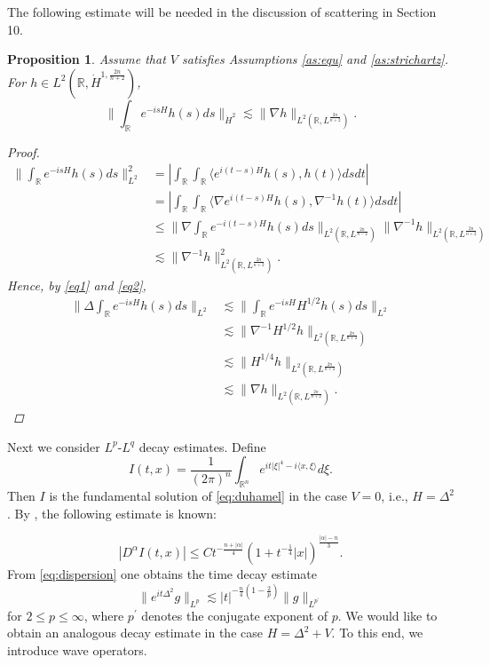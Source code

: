 \documentclass[11pt,a4paper]{article}
\numberwithin{equation}{section}
\newtheorem{proposition}[theorem]{Proposition}
\begin{document}
The following estimate will be needed in the discussion of scattering in Section 10.
\begin{proposition}
Assume that $V$ satisfies Assumptions \ref{as:equ} and \ref{as:strichartz}. For $h\in L^{2}(\mathbb{R}, \dot{H}^{1, \frac{2n}{n + 2}})$,
\begin{equation}\label{strichartz for scattering}
\|\int_{\mathbb{R}} e^{-isH}h(s)ds\|_{\dot{H}^{2}} \lesssim \|\nabla h\|_{L^{2}(\mathbb{R}, L^{\frac{2n}{n + 2}})}.
\end{equation}
\begin{proof}
\begin{align*}
\|\int_{\mathbb{R}} e^{-isH}h(s)ds\|_{L^{2}}^{2} &= \left| \int_{\mathbb{R}} \int_{\mathbb{R}} \langle e^{i(t - s)H}h(s), h(t) \rangle ds dt\right| \\
&= \left| \int_{\mathbb{R}} \int_{\mathbb{R}} \langle \nabla e^{i(t - s)H}h(s), \nabla^{-1} h(t) \rangle ds dt\right| \\
&\leq \|\nabla \int_{\mathbb{R}} e^{-i(t-s)H}h(s)ds\|_{L^{2}(\mathbb{R}, L^{\frac{2n}{n - 2}})}\|\nabla^{-1}h\|_{L^{2}(\mathbb{R}, L^{\frac{2n}{n + 2}})} \\
&\lesssim \|\nabla^{-1}h\|_{L^{2}(\mathbb{R}, L^{\frac{2n}{n + 2}})}^{2}.
\end{align*}
Hence, by \eqref{eq1} and \eqref{eq2},
\begin{align*}
\|\Delta \int_{\mathbb{R}} e^{-isH}h(s)ds\|_{L^{2}} &\lesssim \|\int_{\mathbb{R}} e^{-isH}H^{1/2}h(s)ds\|_{L^{2}} \\
&\lesssim \|\nabla^{-1}H^{1/2}h\|_{L^{2}(\mathbb{R}, L^{\frac{2n}{n + 2}})} \\
&\lesssim \|H^{1/4}h\|_{L^{2}(\mathbb{R}, L^{\frac{2n}{n + 2}})} \\
&\lesssim \|\nabla h\|_{L^{2}(\mathbb{R}, L^{\frac{2n}{n + 2}})}.
\end{align*}
\end{proof}
\end{proposition}

Next we consider $L^{p}$-$L^{q}$ decay estimates. Define
\[ I(t, x) = \dfrac{1}{(2\pi)^{n}}\int_{\mathbb{R}^{n}} e^{it|\xi|^{4} - i\langle x, \xi \rangle} d\xi.\]
Then $I$ is the fundamental solution of \eqref{eq:duhamel} in the case $V = 0$, i.e., $H = \Delta^{2}$. By \cite{Ben}, the following estimate is known:

\begin{equation}\label{eq:dispersion}
|D^{\alpha}I(t, x)| \leq Ct^{-\frac{n + |\alpha|}{4}}(1 + t^{-\frac{1}{4}}|x|)^{\frac{|\alpha|- n}{3}}.
\end{equation}
From \eqref{eq:dispersion} one obtains the time decay estimate
\begin{equation}\label{lplq}
\|e^{it\Delta^{2}}g\|_{L^{p}} \lesssim |t|^{-\frac{n}{4}(1 - \frac{2}{p})}\|g\|_{L^{p^{\prime}}}
\end{equation}
for $2 \leq p \leq \infty$, where $p^{\prime}$ denotes the conjugate exponent of $p$. We would like to obtain an analogous decay estimate in the case $H = \Delta^{2} + V$. To this end, we introduce wave operators.
\end{document}
